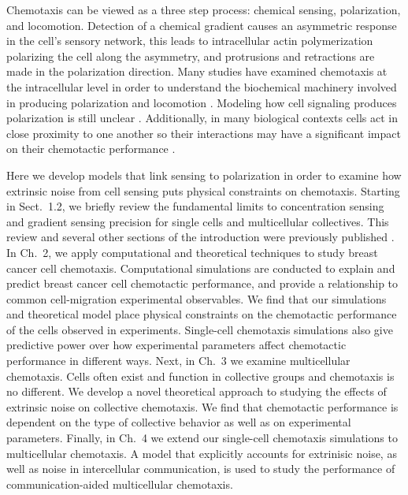 Chemotaxis can be viewed as a three step process: chemical sensing, polarization, and locomotion. Detection of a chemical gradient causes an asymmetric response in the cell's sensory network, this leads to intracellular actin polymerization polarizing the cell along the asymmetry, and protrusions and retractions are made in the polarization direction. Many studies have examined chemotaxis at the intracellular level in order to understand the biochemical machinery involved in producing polarization and locomotion \cite{petrie2009random,jilkine2011comparison}. Modeling how cell signaling produces polarization is still unclear \cite{iglesias2008navigating}. Additionally, in many biological contexts cells act in close proximity to one another so their interactions may have a significant impact on their chemotactic performance \cite{theveneau2010collective}.

Here we develop models that link sensing to polarization in order to examine how extrinsic noise from cell sensing puts physical constraints on chemotaxis. Starting in Sect.\ 1.2, we briefly review the fundamental limits to concentration sensing and gradient sensing precision for single cells and multicellular collectives. This review and several other sections of the introduction were previously published \cite{varennes2016sense}. In Ch.\ 2, we apply computational and theoretical techniques to study breast cancer cell chemotaxis. Computational simulations are conducted to explain and predict breast cancer cell chemotactic performance, and provide a relationship to common cell-migration experimental observables. We find that our simulations and theoretical model place physical constraints on the chemotactic performance of the cells observed in experiments. Single-cell chemotaxis simulations also give predictive power over how experimental parameters affect chemotactic performance in different ways.
Next, in Ch.\ 3 we examine multicellular chemotaxis. Cells often exist and function in collective groups and chemotaxis is no different. We develop a novel theoretical approach to studying the effects of extrinsic noise on collective chemotaxis. We find that chemotactic performance is dependent on the type of collective behavior as well as on experimental parameters.
Finally, in Ch.\ 4 we extend our single-cell chemotaxis simulations to multicellular chemotaxis. A model that explicitly accounts for extrinisic noise, as well as noise in intercellular communication, is used to study the performance of communication-aided multicellular chemotaxis.

